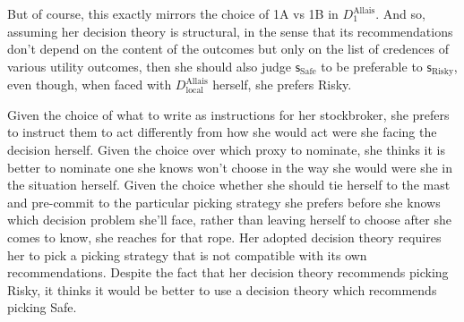 \documentclass[a4paper]{article}
\newcommand\s{\mathsf{s}}
\renewcommand{\color}[1]{}
\newenvironment{colored}[1]{\leavevmode\color{#1}}{}
\newenvironment{CCM rewritten}
{\begingroup\color{blue}} %
{\endgroup}              %
\begin{document}
But of course, this exactly mirrors the choice of 1A vs 1B in $D^{\mathrm{Allais}}_1$. And so, assuming her decision theory is structural, in the sense that its recommendations don't depend on the content of the outcomes but only on the list of credences of various utility outcomes, then she should also judge $\s_{\mathrm{Safe}}$ to be preferable to $\s_{\mathrm{Risky}}$, even though, when faced with  $D^{\mathrm{Allais}}_{\mathrm{local}}$ herself, she prefers Risky.


Given the choice of what to write as instructions for her stockbroker, she prefers to instruct them to act differently from how she would act were she facing the decision herself. Given the choice over which proxy to nominate, she thinks it is better to nominate one she knows won't choose in the way she would were she in the situation herself. 
Given the choice whether she should tie herself to the mast and pre-commit to the particular picking strategy she prefers before she knows which decision problem she'll face, rather than leaving herself to choose after she comes to know, she reaches for that rope. %
 Her adopted decision theory requires her to pick a picking strategy that is not compatible with its own recommendations. 
Despite the fact that her decision theory recommends picking Risky, it thinks it would be better to use a decision theory which recommends picking Safe.

\end{document}
